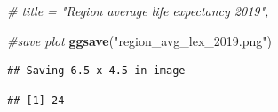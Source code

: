 \documentclass[
]{article}
\newenvironment{Shaded}{\begin{snugshade}}{\end{snugshade}}
\newcommand{\CommentTok}[1]{\textcolor[rgb]{0.56,0.35,0.01}{\textit{#1}}}
\newcommand{\DecValTok}[1]{\textcolor[rgb]{0.00,0.00,0.81}{#1}}
\newcommand{\FunctionTok}[1]{\textcolor[rgb]{0.13,0.29,0.53}{\textbf{#1}}}
\newcommand{\NormalTok}[1]{#1}
\newcommand{\OtherTok}[1]{\textcolor[rgb]{0.56,0.35,0.01}{#1}}
\newcommand{\SpecialCharTok}[1]{\textcolor[rgb]{0.81,0.36,0.00}{\textbf{#1}}}
\newcommand{\StringTok}[1]{\textcolor[rgb]{0.31,0.60,0.02}{#1}}
\begin{document}
\begin{Shaded}
\begin{Highlighting}[]
\CommentTok{\# title = "Region average life expectancy 2019",}

\CommentTok{\#save plot}
\FunctionTok{ggsave}\NormalTok{(}\StringTok{"region\_avg\_lex\_2019.png"}\NormalTok{)}
\end{Highlighting}
\end{Shaded}

\begin{verbatim}
## Saving 6.5 x 4.5 in image
\end{verbatim}

\begin{Shaded}
\end{Shaded}

\begin{verbatim}
## [1] 24
\end{verbatim}
\end{document}
